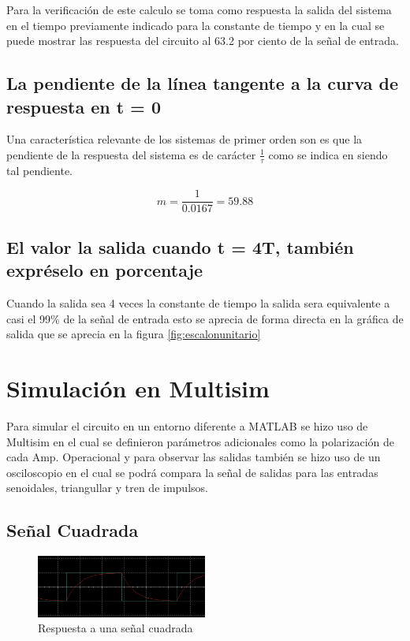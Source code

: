 \documentclass[conference]{IEEEtran}
\begin{document}
	Para la verificación de este calculo se toma como respuesta la salida del sistema en el tiempo previamente indicado para la constante de tiempo y en la  cual se puede mostrar las respuesta del circuito al 63.2 por ciento de la señal de entrada.
	
	\subsection{La pendiente de la línea tangente a la curva de respuesta en t = 0}
	Una característica relevante de los sistemas de primer orden son es que la pendiente de la respuesta del sistema es de carácter $\frac{1}{\tau}$ como se indica en siendo tal pendiente.
	
	\begin{equation}
		m = \frac{1}{0.0167} = 59.88
	\end{equation}
	
	\subsection{El valor la salida cuando t = 4T, también expréselo en porcentaje}
	
	Cuando la salida sea 4 veces la constante de tiempo la salida sera equivalente a casi el 99\%  de la señal de entrada esto se aprecia de forma directa en la gráfica de salida que se aprecia en la figura \ref{fig:escalonunitario}
	
	\section{Simulación en Multisim}
	Para simular el circuito en un entorno diferente a MATLAB se hizo uso de Multisim en el cual se definieron parámetros adicionales como la polarización de cada Amp. Operacional y para observar las salidas también se hizo uso de un osciloscopio en el cual se podrá compara la señal de salidas para las entradas senoidales, triangullar y tren de impulsos.
	
	\subsection{Señal Cuadrada}
	
	\begin{figure}[h]
		\centering
		\includegraphics[width=0.5\textwidth]{../INFORME PREVIO/media/cuadrada}
		\caption{Respuesta a una señal cuadrada}
		\label{fig:cuadrada}
	\end{figure}
	
\end{document}
